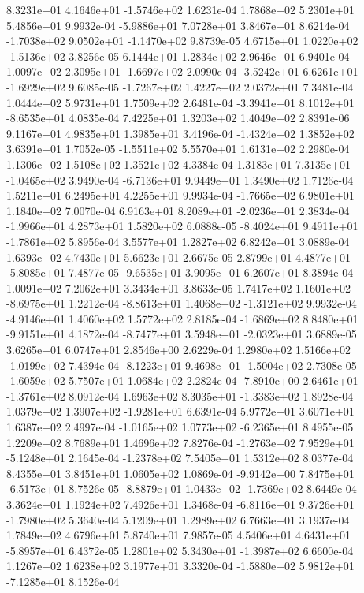  8.3231e+01  4.1646e+01 -1.5746e+02  1.6231e-04
1.7868e+02 5.2301e+01 5.4856e+01  9.9932e-04
-5.9886e+01  7.0728e+01  3.8467e+01  8.6214e-04
-1.7038e+02  9.0502e+01 -1.1470e+02  9.8739e-05
 4.6715e+01  1.0220e+02 -1.5136e+02  3.8256e-05
6.1444e+01 1.2834e+02 2.9646e+01  6.9401e-04
 1.0097e+02  2.3095e+01 -1.6697e+02  2.0990e-04
-3.5242e+01  6.6261e+01 -1.6929e+02  9.6085e-05
-1.7267e+02  1.4227e+02  2.0372e+01  7.3481e-04
1.0444e+02 5.9731e+01 1.7509e+02  2.6481e-04
-3.3941e+01  8.1012e+01 -8.6535e+01  4.0835e-04
7.4225e+01 1.3203e+02 1.4049e+02  2.8391e-06
9.1167e+01 4.9835e+01 1.3985e+01  3.4196e-04
-1.4324e+02  1.3852e+02  3.6391e+01  1.7052e-05
-1.5511e+02  5.5570e+01  1.6131e+02  2.2980e-04
1.1306e+02 1.5108e+02 1.3521e+02  4.3384e-04
 1.3183e+01  7.3135e+01 -1.0465e+02  3.9490e-04
-6.7136e+01  9.9449e+01  1.3490e+02  1.7126e-04
1.5211e+01 6.2495e+01 4.2255e+01  9.9934e-04
-1.7665e+02  6.9801e+01  1.1840e+02  7.0070e-04
 6.9163e+01  8.2089e+01 -2.0236e+01  2.3834e-04
-1.9966e+01  4.2873e+01  1.5820e+02  6.0888e-05
-8.4024e+01  9.4911e+01 -1.7861e+02  5.8956e-04
3.5577e+01 1.2827e+02 6.8242e+01  3.0889e-04
1.6393e+02 4.7430e+01 5.6623e+01  2.6675e-05
 2.8799e+01  4.4877e+01 -5.8085e+01  7.4877e-05
-9.6535e+01  3.9095e+01  6.2607e+01  8.3894e-04
1.0091e+02 7.2062e+01 3.3434e+01  3.8633e-05
 1.7417e+02  1.1601e+02 -8.6975e+01  1.2212e-04
-8.8613e+01  1.4068e+02 -1.3121e+02  9.9932e-04
-4.9146e+01  1.4060e+02  1.5772e+02  2.8185e-04
-1.6869e+02  8.8480e+01 -9.9151e+01  4.1872e-04
-8.7477e+01  3.5948e+01 -2.0323e+01  3.6889e-05
3.6265e+01 6.0747e+01 2.8546e+00  2.6229e-04
 1.2980e+02  1.5166e+02 -1.0199e+02  7.4394e-04
-8.1223e+01  9.4698e+01 -1.5004e+02  2.7308e-05
-1.6059e+02  5.7507e+01  1.0684e+02  2.2824e-04
-7.8910e+00  2.6461e+01 -1.3761e+02  8.0912e-04
 1.6963e+02  8.3035e+01 -1.3383e+02  1.8928e-04
 1.0379e+02  1.3907e+02 -1.9281e+01  6.6391e-04
5.9772e+01 3.6071e+01 1.6387e+02  2.4997e-04
-1.0165e+02  1.0773e+02 -6.2365e+01  8.4955e-05
1.2209e+02 8.7689e+01 1.4696e+02  7.8276e-04
-1.2763e+02  7.9529e+01 -5.1248e+01  2.1645e-04
-1.2378e+02  7.5405e+01  1.5312e+02  8.0377e-04
8.4355e+01 3.8451e+01 1.0605e+02  1.0869e-04
-9.9142e+00  7.8475e+01 -6.5173e+01  8.7526e-05
-8.8879e+01  1.0433e+02 -1.7369e+02  8.6449e-04
3.3624e+01 1.1924e+02 7.4926e+01  1.3468e-04
-6.8116e+01  9.3726e+01 -1.7980e+02  5.3640e-04
5.1209e+01 1.2989e+02 6.7663e+01  3.1937e-04
1.7849e+02 4.6796e+01 5.8740e+01  7.9857e-05
 4.5406e+01  4.6431e+01 -5.8957e+01  6.4372e-05
 1.2801e+02  5.3430e+01 -1.3987e+02  6.6600e-04
1.1267e+02 1.6238e+02 3.1977e+01  3.3320e-04
-1.5880e+02  5.9812e+01 -7.1285e+01  8.1526e-04
